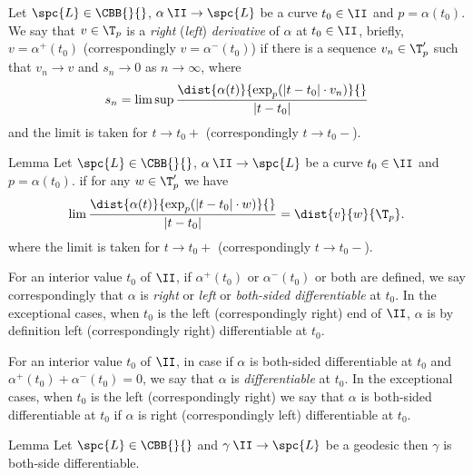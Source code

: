 Let 
$\spc{L}\in\CBB{}{}$,
$\alpha\:\II\to \spc{L}$ be a curve
$t_0\in \II$
and $p=\alpha(t_0)$.
We say that $v\in\T_p$ is a \emph{right} (\emph{left}) \emph{derivative} of $\alpha$ at $t_0\in\II$, 
briefly, $v=\alpha^+(t_0)$ (correspondingly $v=\alpha^-(t_0)$)
if there is a sequence $v_n\in\T_p'$ such that $v_n\to v$
and $s_n\to 0$ as $n\to\infty$, where
\[s_n=\limsup\frac{\dist{\alpha(t)}{\exp_p(|t-t_0|\cdot v_n)}{}}{|t-t_0|}\]
and the limit is taken for $t\to t_0+$ (correspondingly $t\to t_0-$).

\begin{thm}{Lemma}
Let
$\spc{L}\in\CBB{}{}$,
$\alpha\:\II\to \spc{L}$ be a curve
$t_0\in \II$
and $p=\alpha(t_0)$.
if for any $w\in\T_p'$ we have
\[\lim\frac{\dist{\alpha(t)}{\exp_p(|t-t_0|\cdot w)}{}}{|t-t_0|}
=
\dist{v}{w}{\T_p}.\]
where the limit is taken for $t\to t_0+$ (correspondingly $t\to t_0-$).
\end{thm}


For an interior value $t_0$ of $\II$, 
if $\alpha^+(t_0)$ or $\alpha^-(t_0)$ or both are defined,
we say correspondingly that  $\alpha$ is \emph{right} or \emph{left} or \emph{both-sided differentiable} at $t_0$.
In the exceptional cases, when $t_0$ is the left (correspondingly right) end of $\II$, $\alpha$ is by definition left (correspondingly right) differentiable at $t_0$.

For an interior value $t_0$ of $\II$,
in case if $\alpha$ is both-sided differentiable at $t_0$ and $\alpha^+(t_0)+\alpha^-(t_0)=0$, we say that $\alpha$ is \emph{differentiable} at $t_0$.
In the exceptional cases, when $t_0$ is the left (correspondingly right)
we say that $\alpha$ is both-sided differentiable at $t_0$ if $\alpha$ is right (correspondingly left) differentiable at $t_0$.

\begin{thm}{Lemma}
Let $\spc{L}\in\CBB{}{}$ and $\gamma\:\II\to\spc{L}$ be a geodesic then $\gamma$ is both-side differentiable.
\end{thm}





















